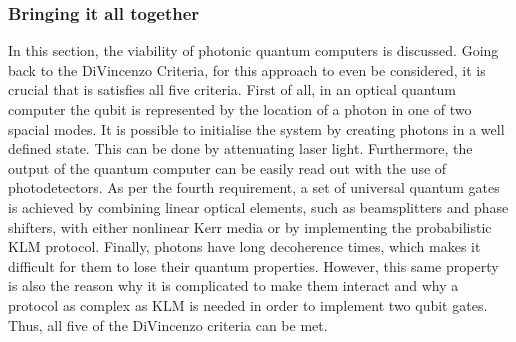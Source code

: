 \subsubsection{Bringing it all together}
In this section, the viability of photonic quantum computers is discussed. Going back to the DiVincenzo Criteria, for this approach to even be considered, it is crucial that is satisfies all five criteria. First of all, in an optical quantum computer the qubit is represented by the location of a photon in one of two spacial modes. It is possible to initialise the system by creating photons in a well defined state. This can be done by attenuating laser light. Furthermore, the output of the quantum computer can be easily read out with the use of photodetectors. As per the fourth requirement, a set of universal quantum gates is achieved by combining linear optical elements, such as beamsplitters and phase shifters, with either nonlinear Kerr media or by implementing the probabilistic KLM protocol. Finally, photons have long decoherence times, which makes it difficult for them to lose their quantum properties. However, this same property is also the reason why it is complicated to make them interact and why a protocol as complex as KLM is needed in order to implement two qubit gates. Thus, all five of the DiVincenzo criteria can be met. 

